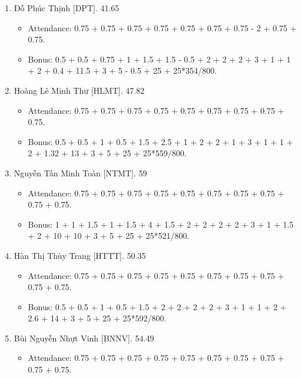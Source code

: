 \documentclass{article}
\begin{document}
\begin{enumerate}
    \begin{itemize}
        \item Attendance: 0.75 + 0.75 + 0.75 + 0.75 + 0.75 + 0.75 - 2 + 0.75 + 0.75 + 0.75.
        \item Bonus: 1 + 1 + 1.5 + 1 + 1.5 + 3 + 1 + 2 + 2 + 2 + 3 + 1 + 1 + 2 + 9.02 + 6.5 + 3 + 5 + 25 + 25*589/800.
    \end{itemize}
    \item {\sc Đỗ Phúc Thịnh [DPT].} 41.65
    \begin{itemize}
        \item Attendance: 0.75 + 0.75 + 0.75 + 0.75 + 0.75 + 0.75 + 0.75 - 2 + 0.75 + 0.75.
        \item Bonus: 0.5 + 0.5 + 0.75 + 1 + 1.5 + 1.5 - 0.5 + 2 + 2 + 2 + 3 + 1 + 1 + 2 + 0.4 + 11.5 + 3 + 5 - 0.5 + 25 + 25*354/800.
    \end{itemize}
    \item {\sc Hoàng Lê Minh Thư [HLMT].} 47.82
    \begin{itemize}
        \item Attendance: 0.75 + 0.75 + 0.75 + 0.75 + 0.75 + 0.75 + 0.75 + 0.75 + 0.75.
        \item Bonus: 0.5 + 0.5 + 1 + 0.5 + 1.5 + 2.5 + 1 + 2 + 2 + 1 + 3 + 1 + 1 + 2 + 1.32 + 13 + 3 + 5 + 25 + 25*559/800.
    \end{itemize}
    \item {\sc Nguyễn Tấn Minh Toàn [NTMT].} 59
    \begin{itemize}
        \item Attendance: 0.75 + 0.75 + 0.75 + 0.75 + 0.75 + 0.75 + 0.75 + 0.75 + 0.75 + 0.75.
        \item Bonus: 1 + 1 + 1.5 + 1 + 1.5 + 4 + 1.5 + 2 + 2 + 2 + 2 + 3 + 1 + 1.5 + 2 + 10 + 10 + 3 + 5 + 25 + 25*521/800.
    \end{itemize}
    \item {\sc Hàn Thị Thùy Trang [HTTT].} 50.35
    \begin{itemize}
        \item Attendance: 0.75 + 0.75 + 0.75 + 0.75 + 0.75 + 0.75 + 0.75 + 0.75 + 0.75 + 0.75.
        \item Bonus: 0.5 + 0.5 + 1 + 0.5 + 1.5 + 2 + 2 + 2 + 2 + 3 + 1 + 1 + 2 + 2.6 + 14 + 3 + 5 + 25 + 25*592/800.
    \end{itemize}
    \item {\sc Bùi Nguyễn Nhựt Vinh [BNNV].} 54.49
    \begin{itemize}
        \item Attendance: 0.75 + 0.75 + 0.75 + 0.75 + 0.75 + 0.75 + 0.75 + 0.75 + 0.75 + 0.75.

\end{itemize}
\end{enumerate}
\end{document}
